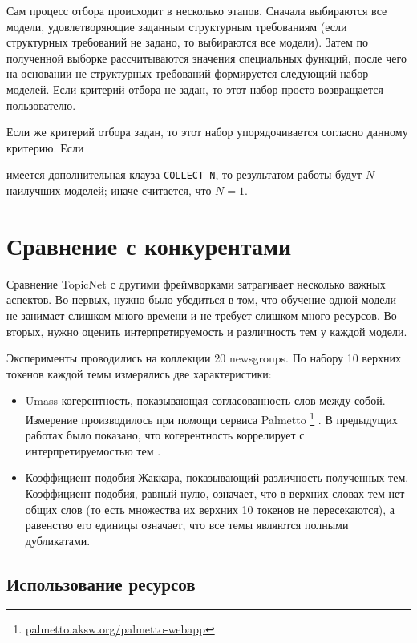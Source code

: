 Сам процесс отбора происходит в несколько этапов. Сначала выбираются все модели, удовлетворяющие заданным структурным требованиям (если структурных требований не задано, то выбираются все модели). Затем по полученной выборке рассчитываются значения специальных функций, после чего на основании не-структурных требований формируется следующий набор моделей. Если критерий отбора не задан, то этот набор просто возвращается пользователю.  

Если же критерий отбора задан, то этот набор упорядочивается согласно данному критерию. Если

имеется дополнительная клауза \texttt{COLLECT N}, то результатом работы будут $N$ наилучших моделей; иначе считается, что $N=1$.  

\section{Сравнение с конкурентами} 

Сравнение TopicNet с другими фреймворками затрагивает несколько важных аспектов. Во-первых, нужно было убедиться в том, что обучение одной модели не занимает слишком много времени и не требует слишком много ресурсов. Во-вторых, нужно оценить интерпретируемость и различность тем у каждой модели.  

Эксперименты проводились на коллекции 20 newsgroups. По набору 10 верхних токенов каждой темы измерялись две характеристики:

\begin{itemize}
    \item Umass-когерентность, показывающая согласованность слов между собой. Измерение производилось при помощи сервиса Palmetto \footnote{\url{palmetto.aksw.org/palmetto-webapp} } \cite{roder2015exploring}. В предыдущих работах было показано, что когерентность коррелирует с интерпретируемостью тем \cite{mimno2011}.
    \item Коэффициент подобия Жаккара, показывающий различность полученных тем. Коэффициент подобия, равный нулю, означает, что в верхних словах тем нет общих слов (то есть множества их верхних 10 токенов не пересекаются), а равенство его единицы означает, что все темы являются полными дубликатами.
\end{itemize} 

\subsection{Использование ресурсов} 

